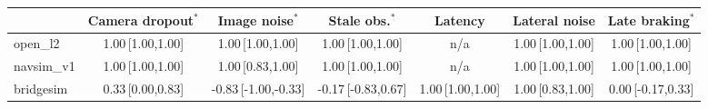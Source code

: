 \begin{tabular}{@{}lcccccc@{}}
\toprule
 & Camera dropout$^{\ast}$ & Image noise$^{\ast}$ & Stale obs.$^{\ast}$ & Latency & Lateral noise & Late braking$^{\ast}$ \\
\midrule
open\_l2 & 1.00\,{\scriptsize[1.00,1.00]} & 1.00\,{\scriptsize[1.00,1.00]} & 1.00\,{\scriptsize[1.00,1.00]} & n/a & 1.00\,{\scriptsize[1.00,1.00]} & 1.00\,{\scriptsize[1.00,1.00]} \\
navsim\_v1 & 1.00\,{\scriptsize[1.00,1.00]} & 1.00\,{\scriptsize[0.83,1.00]} & 1.00\,{\scriptsize[1.00,1.00]} & n/a & 1.00\,{\scriptsize[1.00,1.00]} & 1.00\,{\scriptsize[1.00,1.00]} \\
bridgesim & 0.33\,{\scriptsize[0.00,0.83]} & -0.83\,{\scriptsize[-1.00,-0.33]} & -0.17\,{\scriptsize[-0.83,0.67]} & 1.00\,{\scriptsize[1.00,1.00]} & 1.00\,{\scriptsize[0.83,1.00]} & 0.00\,{\scriptsize[-0.17,0.33]} \\
\bottomrule
\end{tabular}
